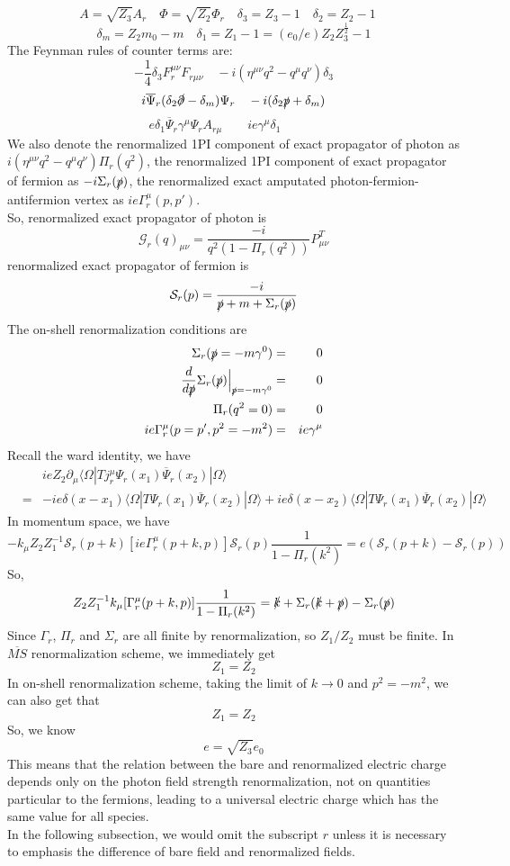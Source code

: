 \documentclass[cyan]{elegantnote}
\begin{document}
\[A = \sqrt{Z_3}A_r \quad \Phi  = \sqrt{Z_2}\Phi_r \quad \delta_{3} = Z_3 - 1 \quad \delta_{2} = Z_2 - 1 \quad \]
\[\delta_m = Z_2 m_0 - m  \quad \delta_1 = Z_1 - 1 =(e_0/e) Z_2 Z_3^{\frac{1}{2}} - 1\]
The Feynman rules of counter terms are:
\[-\frac{1}{4}\delta_3 F_r^{\mu\nu}F_{r\mu\nu} \quad  -i(\eta^{\mu\nu}q^2-q^{\mu}q^{\nu})\delta_3\]
\[i\overline{\Psi}_r (\delta_{2}\slashed{\partial} - \delta_m)\Psi_r \quad -i(\delta_2\slashed{p}+\delta_m)\]
\[ e \delta_1 \overline{\Psi}_r\gamma^{\mu}\Psi_r A_{r\mu} \quad \quad ie \gamma^{\mu}\delta_1 \quad \quad  \quad \]
We also denote the renormalized 1PI component of exact propagator of photon as $i(\eta^{\mu\nu}q^2 -q^{\mu}q^{\nu})\Pi_r(q^2)$, the renormalized 1PI component of exact propagator of fermion as $-i\Sigma_r(\slashed{p})$, the renormalized exact amputated photon-fermion-antifermion vertex as $ie\Gamma^{\mu}_r(p,p')$. \\
So, renormalized exact propagator of photon is
\[\mathcal{G}_r(q)_{\mu\nu} = \frac{-i}{q^2(1-\Pi_r(q^2))}P^T_{\mu\nu}\]
renormalized exact propagator of fermion is
\[\mathcal{S}_r(p) = \frac{-i}{\slashed{p}+m+\Sigma_r(\slashed{p})}\]
The on-shell renormalization conditions are
\begin{eqnarray}
\Sigma_r(\slashed{p}=-m\gamma^0) &=& 0 \nonumber \\
\frac{d}{d\slashed{p}} \Sigma_r(\slashed{p}) \Big|_{\slashed{p} = -m\gamma^0} &=& 0 \nonumber \\
\Pi_r(q^2 = 0) &=& 0 \nonumber \\
ie\Gamma^{\mu}_r(p=p',p^2=-m^2) &=& ie\gamma^{\mu} \nonumber
\end{eqnarray}
Recall the ward identity, we have
\begin{eqnarray}
&\phantom{=}& ieZ_2\partial_{\mu} \langle \Omega | T j_r^{\mu} \Psi_r(x_1) \overline{\Psi}_r(x_2)| \Omega\rangle \nonumber \\
&=& -ie\delta(x-x_1)\langle \Omega | T \Psi_r(x_1) \overline{\Psi}_r(x_2)| \Omega\rangle + ie\delta(x-x_2)\langle \Omega | T \Psi_r(x_1) \overline{\Psi}_r(x_2)| \Omega\rangle \nonumber
\end{eqnarray}
In momentum space, we have
\[-k_{\mu} Z_2 Z_1^{-1} \mathcal{S}_r(p+k) [ie\Gamma^{\mu}_r(p+k,p)] \mathcal{S}_r(p) \frac{1}{1-\Pi_r(k^2)} = e(\mathcal{S}_r(p+k) - \mathcal{S}_r(p)) \]
So,
\[Z_2 Z_1^{-1} k_{\mu} [\Gamma^{\mu}_r(p+k,p)] \frac{1}{1-\Pi_r(k^2)} =\slashed{k}+\Sigma_r(\slashed{k}+\slashed{p})-\Sigma_r(\slashed
{p})\]
Since $\Gamma_r$, $\Pi_r$ and $\Sigma_r$ are all finite by renormalization, so $Z_1/Z_2$ must be finite.
In $\overline{MS}$ renormalization scheme, we immediately get
\[Z_1 = Z_2\]
In on-shell renormalization scheme, taking the limit of $k \to 0$ and $p^2 = -m^2$, we can also get that
\[Z_1 = Z_2\]
So, we know
\[e = \sqrt{Z_3}e_0\]
This means that the relation between the bare and renormalized electric charge depends only on the photon field strength renormalization, not on quantities particular to the fermions, leading to a universal electric charge which has the same value for all species.\\
In the following subsection, we would omit the subscript $r$ unless it is necessary to emphasis the difference of bare field and renormalized fields.
\end{document}
